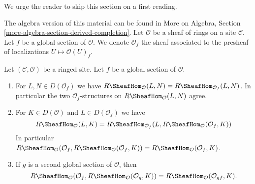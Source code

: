 \noindent
We urge the reader to skip this section on a first reading.

\medskip\noindent
The algebra version of this material can be found in
More on Algebra, Section \ref{more-algebra-section-derived-completion}.
Let $\mathcal{O}$ be a sheaf of rings on a site $\mathcal{C}$.
Let $f$ be a global section of $\mathcal{O}$. We denote
$\mathcal{O}_f$ the sheaf associated to the presheaf of localizations
$U \mapsto \mathcal{O}(U)_f$.

\begin{lemma}
\label{lemma-map-twice-localize}
Let $(\mathcal{C}, \mathcal{O})$ be a ringed site. Let $f$ be a global
section of $\mathcal{O}$.
\begin{enumerate}
\item For $L, N \in D(\mathcal{O}_f)$ we have
$R\SheafHom_\mathcal{O}(L, N) = R\SheafHom_{\mathcal{O}_f}(L, N)$.
In particular the two $\mathcal{O}_f$-structures on
$R\SheafHom_\mathcal{O}(L, N)$ agree.
\item For $K \in D(\mathcal{O})$ and
$L \in D(\mathcal{O}_f)$ we have
$$
R\SheafHom_\mathcal{O}(L, K) =
R\SheafHom_{\mathcal{O}_f}(L, R\SheafHom_\mathcal{O}(\mathcal{O}_f, K))
$$
In particular
$R\SheafHom_\mathcal{O}(\mathcal{O}_f,
R\SheafHom_\mathcal{O}(\mathcal{O}_f, K)) =
R\SheafHom_\mathcal{O}(\mathcal{O}_f, K)$.
\item If $g$ is a second global
section of $\mathcal{O}$, then
$$
R\SheafHom_\mathcal{O}(\mathcal{O}_f, R\SheafHom_\mathcal{O}(\mathcal{O}_g, K))
= R\SheafHom_\mathcal{O}(\mathcal{O}_{gf}, K).
$$
\end{enumerate}
\end{lemma}

